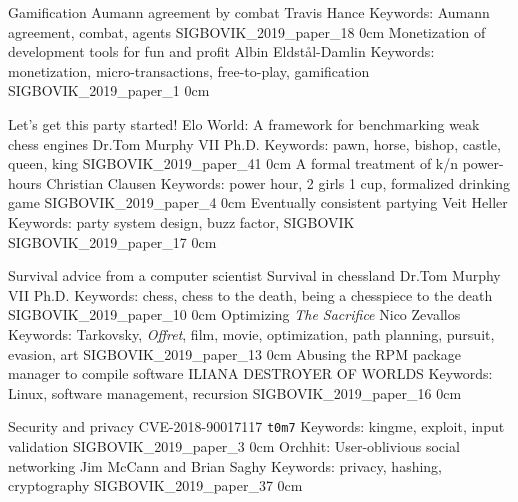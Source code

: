\renewcommand{\thepage}{\roman{page}}
\setcounter{page}{3}

\newpage
\renewcommand{\thepage}{\arabic{page}}
\setcounter{page}{1}

\addtrack
	{}{Gamification}
\addpaper
	{Aumann agreement by combat}
	{Travis Hance}
	{Keywords: Aumann agreement, combat, agents}
	{SIGBOVIK_2019_paper_18}
	{0cm}
	{}
\addpaper
	{Monetization of development tools for fun and profit}
	{Albin Eldstål-Damlin}
	{Keywords: monetization, micro-transactions, free-to-play, gamification}
	{SIGBOVIK_2019_paper_1}
	{0cm}
	{}

\addtrack
	{}{Let's get this party started!}
\addpaper
	{Elo World: A framework for benchmarking weak chess engines}
	{Dr.\@ Tom Murphy VII Ph.D.}
	{Keywords: pawn, horse, bishop, castle, queen, king}
	{SIGBOVIK_2019_paper_41}
	{0cm}
	{}
\addpaper
	{A formal treatment of k/n power-hours}
	{Christian Clausen}
	{Keywords: power hour, 2 girls 1 cup, formalized drinking game}
	{SIGBOVIK_2019_paper_4}
	{0cm}
	{}
\addpaper
	{Eventually consistent partying}
	{Veit Heller}
	{Keywords: party system design, buzz factor, SIGBOVIK}
	{SIGBOVIK_2019_paper_17}
	{0cm}
	{}

\addtrack
	{}{Survival advice from a computer scientist}
\addpaper
	{Survival in chessland}
	{Dr.\@ Tom Murphy VII Ph.D.}
	{Keywords: chess, chess to the death, being a chesspiece to the death}
	{SIGBOVIK_2019_paper_10}
	{0cm}
	{}
\addpaper
	{Optimizing \textit{The Sacrifice}}
	{Nico Zevallos}
	{Keywords: Tarkovsky, \textit{Offret}, film, movie, optimization, path planning, pursuit, evasion, art}
	{SIGBOVIK_2019_paper_13}
	{0cm}
	{}
\addpaper
	{Abusing the RPM package manager to compile software}
	{ILIANA DESTROYER OF WORLDS}
	{Keywords: Linux, software management, recursion}
	{SIGBOVIK_2019_paper_16}
	{0cm}
	{}

\addtrack
	{}{Security and privacy}
\addpaper
	{CVE-2018-90017117}
	{\texttt{t0m7}}
	{Keywords: kingme, exploit, input validation}
	{SIGBOVIK_2019_paper_3}
	{0cm}
	{}
\addpaper
	{Orchhit: User-oblivious social networking}
	{Jim McCann and Brian Saghy}
	{Keywords: privacy, hashing, cryptography}
	{SIGBOVIK_2019_paper_37}
	{0cm}
	{}


